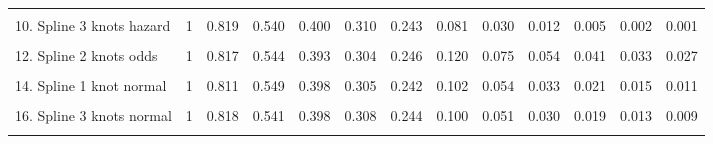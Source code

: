 \documentclass[]{article}
\begin{document}
\begin{table}
{\begin{tabular}[t]{lrrrrrrrrrrrr}
\cellcolor{gray!6}{9. Spline 2 knots hazard} & \cellcolor{gray!6}{1} & \cellcolor{gray!6}{0.817} & \cellcolor{gray!6}{0.546} & \cellcolor{gray!6}{0.396} & \cellcolor{gray!6}{0.305} & \cellcolor{gray!6}{0.243} & \cellcolor{gray!6}{0.096} & \cellcolor{gray!6}{0.043} & \cellcolor{gray!6}{0.021} & \cellcolor{gray!6}{0.010} & \cellcolor{gray!6}{0.005} & \cellcolor{gray!6}{0.003}\\
10. Spline 3 knots hazard & 1 & 0.819 & 0.540 & 0.400 & 0.310 & 0.243 & 0.081 & 0.030 & 0.012 & 0.005 & 0.002 & 0.001\\
\cellcolor{gray!6}{11. Spline 1 knot odds} & \cellcolor{gray!6}{1} & \cellcolor{gray!6}{0.820} & \cellcolor{gray!6}{0.542} & \cellcolor{gray!6}{0.390} & \cellcolor{gray!6}{0.303} & \cellcolor{gray!6}{0.248} & \cellcolor{gray!6}{0.127} & \cellcolor{gray!6}{0.082} & \cellcolor{gray!6}{0.060} & \cellcolor{gray!6}{0.047} & \cellcolor{gray!6}{0.038} & \cellcolor{gray!6}{0.032}\\
12. Spline 2 knots odds & 1 & 0.817 & 0.544 & 0.393 & 0.304 & 0.246 & 0.120 & 0.075 & 0.054 & 0.041 & 0.033 & 0.027\\
\cellcolor{gray!6}{13. Spline 3 knots odds} & \cellcolor{gray!6}{1} & \cellcolor{gray!6}{0.818} & \cellcolor{gray!6}{0.542} & \cellcolor{gray!6}{0.398} & \cellcolor{gray!6}{0.308} & \cellcolor{gray!6}{0.246} & \cellcolor{gray!6}{0.110} & \cellcolor{gray!6}{0.065} & \cellcolor{gray!6}{0.044} & \cellcolor{gray!6}{0.033} & \cellcolor{gray!6}{0.026} & \cellcolor{gray!6}{0.021}\\
14. Spline 1 knot normal & 1 & 0.811 & 0.549 & 0.398 & 0.305 & 0.242 & 0.102 & 0.054 & 0.033 & 0.021 & 0.015 & 0.011\\
\cellcolor{gray!6}{15. Spline 2 knots normal} & \cellcolor{gray!6}{1} & \cellcolor{gray!6}{0.815} & \cellcolor{gray!6}{0.546} & \cellcolor{gray!6}{0.392} & \cellcolor{gray!6}{0.303} & \cellcolor{gray!6}{0.245} & \cellcolor{gray!6}{0.113} & \cellcolor{gray!6}{0.065} & \cellcolor{gray!6}{0.042} & \cellcolor{gray!6}{0.029} & \cellcolor{gray!6}{0.021} & \cellcolor{gray!6}{0.016}\\
16. Spline 3 knots normal & 1 & 0.818 & 0.541 & 0.398 & 0.308 & 0.244 & 0.100 & 0.051 & 0.030 & 0.019 & 0.013 & 0.009\\
\cellcolor{gray!6}{17. Mixture cure Weibull} & \cellcolor{gray!6}{1} & \cellcolor{gray!6}{0.819} & \cellcolor{gray!6}{0.585} & \cellcolor{gray!6}{0.403} & \cellcolor{gray!6}{0.290} & \cellcolor{gray!6}{0.229} & \cellcolor{gray!6}{0.179} & \cellcolor{gray!6}{0.179} & \cellcolor{gray!6}{0.179} & \cellcolor{gray!6}{0.179} & \cellcolor{gray!6}{0.179} & \cellcolor{gray!6}{0.179}\\

\end{tabular}}
\end{table}
\end{document}
